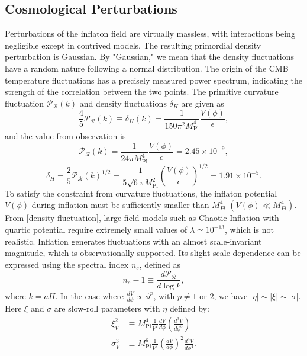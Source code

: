\documentclass[12pt]{article}
\numberwithin{equation}{section}
\begin{document}
\subsection{Cosmological Perturbations}
Perturbations of the inflaton field are virtually massless, with interactions being negligible except in contrived models. The resulting primordial density perturbation is Gaussian. By "Gaussian," we mean that the density fluctuations have a random nature following a normal distribution. The origin of the CMB temperature fluctuations has a precisely measured power spectrum, indicating the strength of the correlation between the two points. The primitive curvature fluctuation $\mathcal{P}_{\mathcal{R}}(k)$ and density fluctuations $\delta_H$ are given \cite{Lyth:1998xn} as
\begin{equation}
    \frac{4}{5} \mathcal{P}_{\mathcal{R}}(k) \equiv \delta_H (k) = \frac{1}{150\pi^2 M_{\textrm{Pl}}^4}\frac{V(\phi)}{\epsilon}, 
\end{equation}
and the value from observation \cite{BICEP:2021xfz} is
\begin{equation}\label{PCF}
    \mathcal{P}_{\mathcal{R}}(k) = \frac{1}{24\pi M_{\textrm{Pl}}^4}\frac{V(\phi)}{\epsilon} = 2.45 \times 10^{-9},
\end{equation}
\begin{equation}\label{density fluctuation}
    \delta_H = \frac{2}{5}\mathcal{P}_{\mathcal{R}}(k)^{1/2} = \frac{1}{5\sqrt{6}\pi M_{\textrm{Pl}}^2}\left( \frac{V(\phi)}{\epsilon} \right)^{1/2} = 1.91 \times 10^{-5}.
\end{equation}
To satisfy the constraint from curvature fluctuations, the inflaton potential $V(\phi)$ during inflation must be sufficiently smaller than $M_{Pl}^4$ $(V(\phi) \ll M_{Pl}^4)$. From \eqref{density fluctuation}, large field models such as Chaotic Inflation with quartic potential require extremely small values of $\lambda \simeq 10^{-13}$, which is not realistic. Inflation generates fluctuations with an almost scale-invariant magnitude, which is observationally supported. Its slight scale dependence can be expressed using the spectral index $n_s$, defined as
\begin{equation}
    n_s - 1 \equiv \frac{d\mathcal{P}_{\mathcal{R}}}{d \log k },
\end{equation}
where $k = aH$. In the case where $\frac{dV}{d\phi} \propto \phi^p$, with $p \neq 1$ or $2$, we have $|\eta|\sim |\xi| \sim |\sigma|$. Here $\xi$ and $\sigma$ are slow-roll parameters with $\eta$ defined by:
\begin{align}
    \xi^{2}_{V} &\equiv M_{\textrm{Pl}}^4 \frac{1}{V^2}\frac{dV}{d\phi}\left( \frac{d^3 V}{d\phi^3} \right)\\
    \sigma^{3}_{V} &\equiv M_{\textrm{Pl}}^6 \frac{1}{V^3}\left( \frac{dV}{d\phi} \right)^2 \frac{d^4 V}{d\phi^4}.
\end{align}
\end{document}
